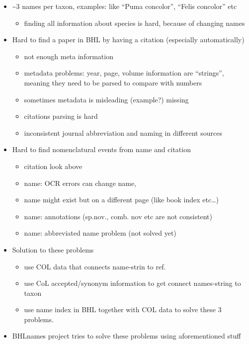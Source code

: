 \documentclass[
]{article}
\providecommand{\tightlist}{%
  \setlength{\itemsep}{0pt}\setlength{\parskip}{0pt}}
\begin{document}
\begin{itemize}
\tightlist
\item
  \textasciitilde3 names per taxon, examples: like ``Puma concolor'',
  ``Felis concolor'' etc

  \begin{itemize}
  \tightlist
  \item
    finding all information about species is hard, because of changing
    names
  \end{itemize}
\item
  Hard to find a paper in BHL by having a citation (especially
  automatically)

  \begin{itemize}
  \tightlist
  \item
    not enough meta information
  \item
    metadata problems: year, page, volume information are ``strings'',
    meaning they need to be parsed to compare with numbers
  \item
    sometimes metadata is misleading (example?) missing
  \item
    citations parsing is hard
  \item
    inconsistent journal abbreviation and naming in different sources
  \end{itemize}
\item
  Hard to find nomenclatural events from name and citation

  \begin{itemize}
  \tightlist
  \item
    citation look above
  \item
    name: OCR errors can change name,
  \item
    name might exist but on a different page (like book index etc\ldots)
  \item
    name: annotations (sp.nov., comb. nov etc are not consistent)
  \item
    name: abbreviated name problem (not solved yet)
  \end{itemize}
\item
  Solution to these problems

  \begin{itemize}
  \tightlist
  \item
    use COL data that connects name-strin to ref.
  \item
    use CoL accepted/synonym information to get connect names-string to
    taxon
  \item
    use name index in BHL together with COL data to solve these 3
    problems.
  \end{itemize}
\item
  BHLnames project tries to solve these problems using aforementioned
  stuff
\end{itemize}
\end{document}
